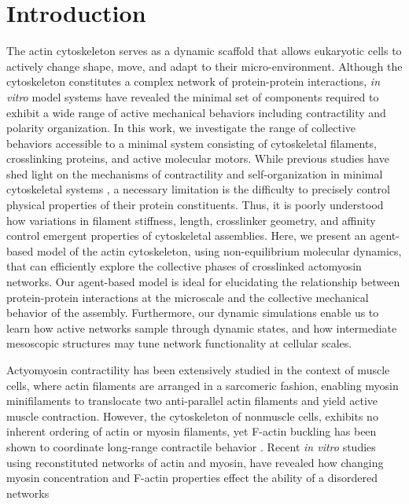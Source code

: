 \documentclass[12pt]{article}
\begin{document}
\section{Introduction} 
The actin cytoskeleton serves as a dynamic scaffold that allows eukaryotic cells
to actively change shape, move, and adapt to their micro-environment. Although 
the cytoskeleton constitutes a complex network of protein-protein
interactions, {\em in vitro} model systems have revealed the minimal set of 
components required to exhibit a wide range of active mechanical behaviors 
including contractility and polarity organization\cite{murrell2012,murrell2014,
takiguchi1991}. In this work, we investigate the range of collective behaviors 
accessible to a minimal system consisting of cytoskeletal filaments, 
crosslinking proteins, and active molecular motors. While previous studies have 
shed light on the mechanisms of contractility and self-organization in minimal 
cytoskeletal systems \cite{takiguchi1991,nedelec2002,dasanyake2011,murrell2012,wang2012,ennomani2016}, 
a necessary limitation is the difficulty to precisely control physical 
properties of their protein constituents. Thus, it is poorly understood how 
variations in filament stiffness, length, crosslinker geometry, and affinity 
control emergent properties of cytoskeletal assemblies.  
Here, we present an agent-based model of the actin cytoskeleton, using
non-equilibrium molecular dynamics, that can efficiently explore the 
collective phases of crosslinked actomyosin networks. Our agent-based model is
ideal for elucidating the relationship between protein-protein interactions at
the microscale and the collective mechanical behavior of the assembly.
Furthermore, our dynamic simulations enable us to learn how active networks 
sample through dynamic states, and how intermediate mesoscopic structures may 
tune network functionality at cellular scales.
\par
Actyomyosin contractility has been extensively studied in the context of  muscle
cells, where actin filaments are arranged in a sarcomeric fashion, enabling 
myosin minifilaments to translocate two anti-parallel actin filaments and yield 
active muscle contraction\cite{huxley1969}. However, the cytoskeleton of 
nonmuscle cells, exhibits no inherent ordering of actin or myosin filaments, yet
F-actin buckling has been shown to coordinate long-range contractile behavior 
\cite{lenz2012,murrell2012,murrell2015}.
Recent {\em in vitro} studies using 
reconstituted networks of actin and myosin, have revealed how changing myosin 
concentration and F-actin properties effect the ability of a disordered networks
\end{document}
